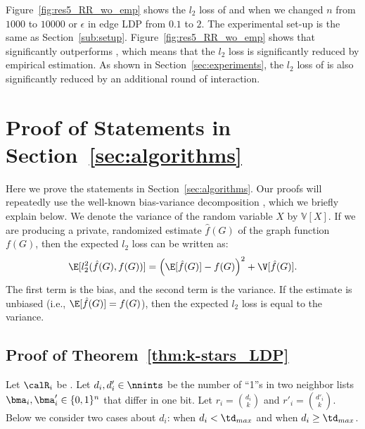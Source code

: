 Figure~\ref{fig:res5_RR_wo_emp} shows the $l_2$ loss of  and  when we changed $n$ from $1000$ to $10000$ or $\epsilon$ in edge LDP from $0.1$ to $2$. 
The experimental set-up is the same as Section~\ref{sub:setup}. 
Figure~\ref{fig:res5_RR_wo_emp} shows that  significantly outperforms , which means that the $l_2$ loss is significantly reduced by empirical estimation. 
As shown in Section~\ref{sec:experiments}, the $l_2$ loss of  is also significantly reduced by an additional round of interaction.

\section{Proof of Statements in Section~\ref{sec:algorithms}}
\label{sec:proof}
Here we prove the statements in Section~\ref{sec:algorithms}. 
Our proofs will repeatedly use the well-known bias-variance decomposition \cite{mlpp}, which we briefly explain below. 
We denote the variance of the random variable $X$ by $\mathbb{V}[X]$. 
If we are producing a private, randomized estimate $\hat{f}(G)$ of the graph function $f(G)$, then the expected $l_2$ loss can be written as: 
\begin{equation}\label{eq:bias-var}
  \E[l_2^2(\hat{f}(G),f(G))] = \left(\E[\hat{f}(G)] - f(G)\right)^2
  + \V[\hat{f}(G)].
\end{equation}
The first term is the bias, and the second term is the variance. 
If the estimate is unbiased (i.e., $\E[\hat{f}(G)] = f(G)$), then the expected $l_2$ loss is equal to the variance.

\subsection{Proof of Theorem~\ref{thm:k-stars_LDP}}
Let $\calR_i$ be . 
Let $d_i,d'_i \in \nnints$ be the number of ``1''s in two neighbor lists $\bma_i,\bma'_i \in \{0,1\}^n$ that differ in one bit. 
Let $r_i = \binom{d_i}{k}$ and $r'_i = \binom{d'_i}{k}$. 
Below we consider two cases about $d_i$: when $d_i < \td_{max}$ and when $d_i \geq \td_{max}$.

